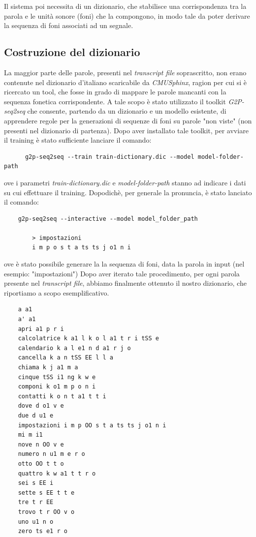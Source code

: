 \documentclass[12pt]{article}
\begin{document}
    Il sistema poi necessita di un dizionario, che stabilisce una corrispondenza tra la parola e le unità sonore (foni) che la compongono, in modo tale da poter derivare la sequenza di foni associati ad un segnale.  
    
    
    \subsection{Costruzione del dizionario}
    
    La maggior parte delle parole, presenti nel \textit{transcript file} soprascritto, non erano contenute nel dizionario d'italiano scaricabile da \textit{CMUSphinx}, ragion per cui si è ricercato un tool, che fosse in grado di mappare le parole mancanti con la sequenza fonetica corrispondente.
    A tale scopo è stato utilizzato il toolkit \textit{G2P-seq2seq} che consente, partendo da un dizionario e un modello esistente,  di apprendere regole per la generazioni di sequenze di foni su parole "non viste" (non presenti nel dizionario di partenza).  
    Dopo aver installato tale toolkit, per avviare il training è stato sufficiente lanciare il comando: 
    \begin{lstlisting}
      g2p-seq2seq --train train-dictionary.dic --model model-folder-path
    \end{lstlisting}
    ove i parametri \textit{train-dictionary.dic} e \textit{model-folder-path} stanno ad indicare i dati su cui effettuare il training.
    Dopodichè, per generale la pronuncia, è stato lanciato il comando:
    \newpage
    \begin{lstlisting}
    g2p-seq2seq --interactive --model model_folder_path
        
        > impostazioni
        i m p o s t a ts ts j o1 n i
    \end{lstlisting}
    ove è stato possibile generare la la sequenza di foni, data la parola in input (nel esempio: "impostazioni")
    Dopo aver iterato tale procedimento, per ogni parola presente nel \textit{transcript file}, abbiamo finalmente ottenuto il nostro dizionario, che riportiamo a scopo esemplificativo.
    \begin{lstlisting}
    a a1
    a' a1
    apri a1 p r i
    calcolatrice k a1 l k o l a1 t r i tSS e
    calendario k a l e1 n d a1 r j o
    cancella k a n tSS EE l l a
    chiama k j a1 m a
    cinque tSS i1 ng k w e
    componi k o1 m p o n i
    contatti k o n t a1 t t i
    dove d o1 v e
    due d u1 e
    impostazioni i m p OO s t a ts ts j o1 n i
    mi m i1
    nove n OO v e
    numero n u1 m e r o
    otto OO t t o
    quattro k w a1 t t r o
    sei s EE i
    sette s EE t t e
    tre t r EE
    trovo t r OO v o
    uno u1 n o
    zero ts e1 r o 
    \end{lstlisting}
    
\end{document}
